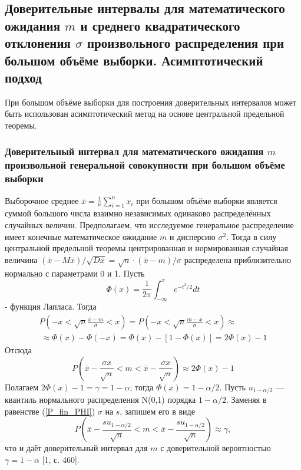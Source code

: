 \documentclass[12pt,a4paper]{scrartcl}
\begin{document}
    \subsection{Доверительные интервалы для математического ожидания $m$ и среднего квадратического отклонения $\sigma$ произвольного распределения при большом объёме выборки. Асимптотический подход}
    При большом объёме выборки для построения доверительных интервалов может быть использован асимптотический метод на основе центральной предельной теоремы.
    \subsubsection{Доверительный интервал для математического ожидания $m$ произвольной генеральной совокупности при большом объёме выборки}
    Выборочное среднее $\bar{x} = \frac{1}{n}\sum_{i = 1}^{n}{x_{i}}$ при большом объёме выборки является суммой большого числа взаимно независимых одинаково распределённых случайных величин. Предполагаем, что исследуемое генеральное распределение имеет конечные математическое ожидание $m$ и дисперсию $\sigma^{2}$. Тогда в силу центральной предельной теоремы центрированная и нормированная случайная величина $(\bar{x} - M\bar{x}) / \sqrt{D\bar{x}} = \sqrt{n}·(\bar{x}-m)/\sigma$ распределена приблизительно нормально с параметрами 0 и 1. Пусть
    \begin{equation}
        \Phi(x) = \frac{1}{2\pi}\int_{-\infty}^{x}{e^{-t^{2}/2}dt}
        \label{f_lapl}
    \end{equation}
    - функция Лапласа. Тогда
    \begin{multline}
        P\left(-x < \sqrt{n}\frac{\bar{x} - m}{\sigma} < x \right) = 
        P\left(-x < \sqrt{n}\frac{m - \bar{x}}{\sigma} < x \right) \approx \\\
        \approx \Phi(x) - \Phi(-x)=\Phi(x) - [1 - \Phi(x)] = 2\Phi(x) - 1
        \label{P_PHI}
    \end{multline}
    Отсюда
    \begin{equation}
        P\left(\bar{x} - \frac{\sigma x}{\sqrt{n}} < m < \bar{x} - \frac{\sigma x}{\sqrt{n}} \right) \approx 2\Phi(x) - 1
        \label{P_fin_PHI}
    \end{equation}
    Полагаем $2\Phi(x) - 1 = \gamma = 1 - \alpha$; тогда $\Phi(x) = 1 - \alpha/2$. Пусть $u_{1-\alpha/2}$ — квантиль нормального распределения N(0,1) порядка $1-\alpha/2$. Заменяя в равенстве (\ref{P_fin_PHI}) $\sigma$ на $s$, запишем его в виде
    \begin{equation}
        P\left(\bar{x} - \frac{su_{1-\alpha/2}}{\sqrt{n}} < m < \bar{x} - \frac{su_{1-\alpha/2}}{\sqrt{n}} \right) \approx \gamma,
        \label{P_fin_u}
    \end{equation}
    что и даёт доверительный интервал для $m$ с доверительной вероятностью $\gamma = 1-\alpha$ [1, с. 460].
    
\end{document}
